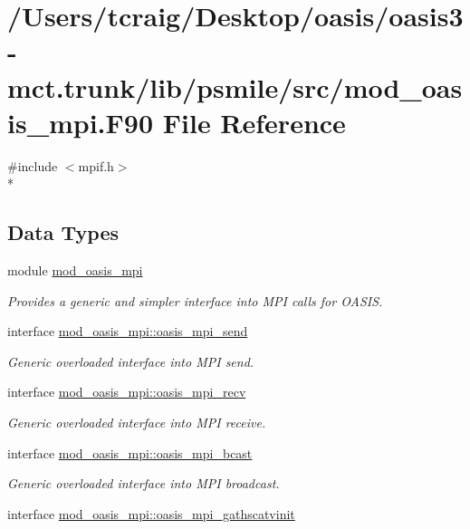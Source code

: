 \hypertarget{mod__oasis__mpi_8_f90}{\section{/\+Users/tcraig/\+Desktop/oasis/oasis3-\/mct.trunk/lib/psmile/src/mod\+\_\+oasis\+\_\+mpi.F90 File Reference}
\label{mod__oasis__mpi_8_f90}
}
{\ttfamily \#include $<$mpif.\+h$>$}\\*
\subsection*{Data Types}
\begin{DoxyCompactItemize}
\item 
module \hyperlink{classmod__oasis__mpi}{mod\+\_\+oasis\+\_\+mpi}
\begin{DoxyCompactList}\small\item\em Provides a generic and simpler interface into M\+P\+I calls for O\+A\+S\+I\+S. \end{DoxyCompactList}\item 
interface \hyperlink{interfacemod__oasis__mpi_1_1oasis__mpi__send}{mod\+\_\+oasis\+\_\+mpi\+::oasis\+\_\+mpi\+\_\+send}
\begin{DoxyCompactList}\small\item\em Generic overloaded interface into M\+P\+I send. \end{DoxyCompactList}\item 
interface \hyperlink{interfacemod__oasis__mpi_1_1oasis__mpi__recv}{mod\+\_\+oasis\+\_\+mpi\+::oasis\+\_\+mpi\+\_\+recv}
\begin{DoxyCompactList}\small\item\em Generic overloaded interface into M\+P\+I receive. \end{DoxyCompactList}\item 
interface \hyperlink{interfacemod__oasis__mpi_1_1oasis__mpi__bcast}{mod\+\_\+oasis\+\_\+mpi\+::oasis\+\_\+mpi\+\_\+bcast}
\begin{DoxyCompactList}\small\item\em Generic overloaded interface into M\+P\+I broadcast. \end{DoxyCompactList}\item 
interface \hyperlink{interfacemod__oasis__mpi_1_1oasis__mpi__gathscatvinit}{mod\+\_\+oasis\+\_\+mpi\+::oasis\+\_\+mpi\+\_\+gathscatvinit}

\end{DoxyCompactItemize}
